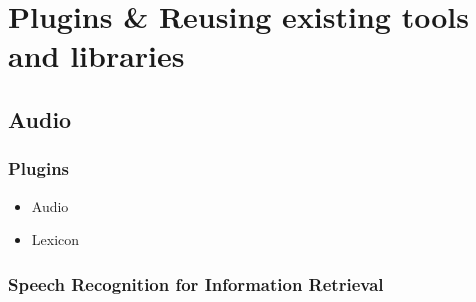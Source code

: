 \documentclass{beamer}
\begin{document}
%


\section[Plugins]{Plugins \& Reusing existing tools and libraries}

\subsection{Audio}
%
%
%
%




\begin{frame}
\frametitle{Plugins}
\begin{itemize}
  \item Audio
  \item Lexicon
\end{itemize}

\end{frame}

\subsubsection[ASR]{Speech Recognition for Information Retrieval}
\end{document}
